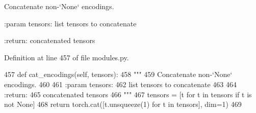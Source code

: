 \begin{DoxyVerb}Concatenate non-`None` encodings.

:param tensors:
    list tensors to concatenate

:return:
    concatenated tensors
\end{DoxyVerb}
 

Definition at line 457 of file modules.\+py.


\begin{DoxyCode}
457     \textcolor{keyword}{def }cat\_encodings(self, tensors):
458         \textcolor{stringliteral}{"""}
459 \textcolor{stringliteral}{        Concatenate non-`None` encodings.}
460 \textcolor{stringliteral}{}
461 \textcolor{stringliteral}{        :param tensors:}
462 \textcolor{stringliteral}{            list tensors to concatenate}
463 \textcolor{stringliteral}{}
464 \textcolor{stringliteral}{        :return:}
465 \textcolor{stringliteral}{            concatenated tensors}
466 \textcolor{stringliteral}{        """}
467         tensors = [t \textcolor{keywordflow}{for} t \textcolor{keywordflow}{in} tensors \textcolor{keywordflow}{if} t \textcolor{keywordflow}{is} \textcolor{keywordflow}{not} \textcolor{keywordtype}{None}]
468         \textcolor{keywordflow}{return} torch.cat([t.unsqueeze(1) \textcolor{keywordflow}{for} t \textcolor{keywordflow}{in} tensors], dim=1)
469 
\end{DoxyCode}
\mbox{\label{classprojects_1_1image__chat_1_1transresnet__multimodal_1_1modules_1_1TransresnetMultimodalModel_a528f9ad05ca6c0f0932b13b404ee054b}} 
